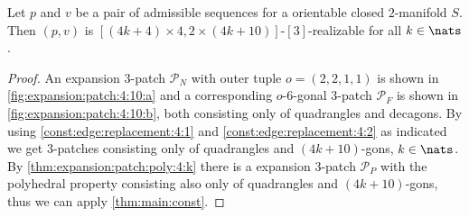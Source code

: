 \clearpage
\begin{theorem}
  Let $p$ and $v$ be a pair of admissible sequences for a orientable closed $2$-manifold $S$. Then $(p, v)$ is $[(4k + 4) \times 4, 2 \times (4k+10)]$-$[3]$-realizable for all $k \in \nats$.
  \begin{proof}
    An expansion $3$-patch $\mathcal{P}_N$ with outer tuple $o = (2, 2, 1, 1)$ is shown in \autoref{fig:expansion:patch:4:10:a} and a corresponding $o$-$6$-gonal $3$-patch $\mathcal{P}_F$ is shown in \autoref{fig:expansion:patch:4:10:b}, both consisting only of quadrangles and decagons. By using \autoref{const:edge:replacement:4:1} and \autoref{const:edge:replacement:4:2} as indicated we get $3$-patches consisting only of quadrangles and $(4k+10)$-gons, $k \in \nats$. By \autoref{thm:expansion:patch:poly:4:k} there is a expansion $3$-patch $\mathcal{P}_P$ with the polyhedral property consisting also only of quadrangles and $(4k+10)$-gons, thus we can apply \autoref{thm:main:const}.
  \end{proof}
\end{theorem}
{\par\vspace*{\fill}}
